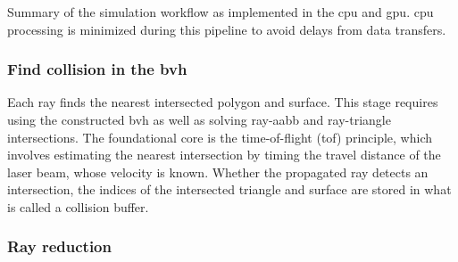 \begin{marginfigure}[-4.0cm]
	\caption{Summary of the simulation workflow as implemented in the \acrshort{cpu} and \acrshort{gpu}. \acrshort{cpu} processing is minimized during this pipeline to avoid delays from data transfers.}
	\label{fig:lidar_workflow}
\end{marginfigure}

\subsubsection{Find collision in the \acrshort{bvh}}

Each ray finds the nearest intersected polygon and surface. This stage requires using the constructed \acrshort{bvh} as well as solving ray-\acrshort{aabb} and ray-triangle intersections. The foundational core is the time-of-flight (\acrshort{tof}) principle, which involves estimating the nearest intersection by timing the travel distance of the laser beam, whose velocity is known. Whether the propagated ray detects an intersection, the indices of the intersected triangle and surface are stored in what is called a collision buffer. 

\subsubsection{Ray reduction}

